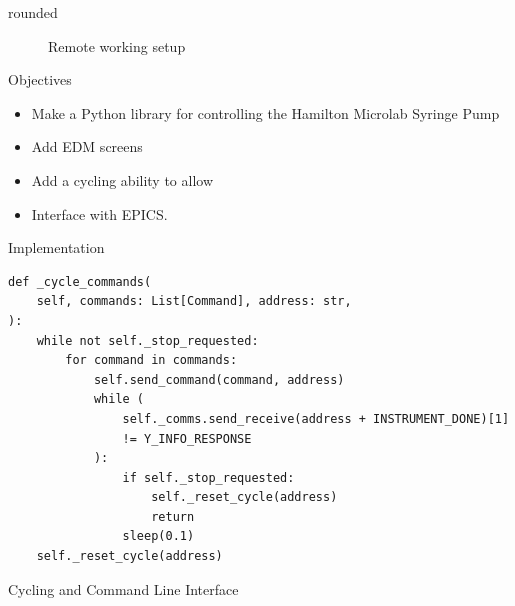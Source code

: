 \documentclass[a0paper,landscape]{baposter}
\begin{document}
\begin{poster}
\begin{posterbox}[column=0,headerfont={},headershape=rounded,boxheaderheight=0em,boxColorOne=white,borderColor=white,below=introduction]{rounded}
\begin{figure}[H]
\begin{center}
\caption{Remote working setup}
\end{center}
\end{figure}
\end{posterbox}

\begin{posterbox}[name=objectives,column=1,row=0,span=2]{Objectives}
 \begin{itemize}
    \item Make a Python library for controlling the Hamilton Microlab Syringe Pump
    \item Add EDM screens
    \item Add a cycling ability to allow
    \item Interface with EPICS.
\end{itemize}
\end{posterbox}

\begin{posterbox}[name=implementation,column=1,span=2,below=objectives]{Implementation}
\begin{verbatim}
def _cycle_commands(
    self, commands: List[Command], address: str,
):
    while not self._stop_requested:
        for command in commands:
            self.send_command(command, address)
            while (
                self._comms.send_receive(address + INSTRUMENT_DONE)[1]
                != Y_INFO_RESPONSE
            ):
                if self._stop_requested:
                    self._reset_cycle(address)
                    return
                sleep(0.1)
    self._reset_cycle(address)
\end{verbatim}
\end{posterbox}

\begin{posterbox}[name=cycling,column=1,span=2,below=implementation]{Cycling and Command Line Interface}
\end{posterbox}


\end{poster}
\end{document}
